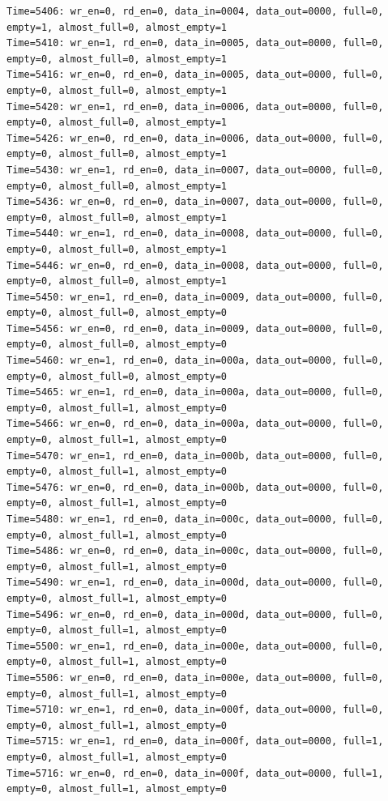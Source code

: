 \documentclass[UTF8]{ctexart}
\begin{document}
\begin{lstlisting}[frame=shadowbox]
Time=5406: wr_en=0, rd_en=0, data_in=0004, data_out=0000, full=0, empty=1, almost_full=0, almost_empty=1
Time=5410: wr_en=1, rd_en=0, data_in=0005, data_out=0000, full=0, empty=0, almost_full=0, almost_empty=1
Time=5416: wr_en=0, rd_en=0, data_in=0005, data_out=0000, full=0, empty=0, almost_full=0, almost_empty=1
Time=5420: wr_en=1, rd_en=0, data_in=0006, data_out=0000, full=0, empty=0, almost_full=0, almost_empty=1
Time=5426: wr_en=0, rd_en=0, data_in=0006, data_out=0000, full=0, empty=0, almost_full=0, almost_empty=1
Time=5430: wr_en=1, rd_en=0, data_in=0007, data_out=0000, full=0, empty=0, almost_full=0, almost_empty=1
Time=5436: wr_en=0, rd_en=0, data_in=0007, data_out=0000, full=0, empty=0, almost_full=0, almost_empty=1
Time=5440: wr_en=1, rd_en=0, data_in=0008, data_out=0000, full=0, empty=0, almost_full=0, almost_empty=1
Time=5446: wr_en=0, rd_en=0, data_in=0008, data_out=0000, full=0, empty=0, almost_full=0, almost_empty=1
Time=5450: wr_en=1, rd_en=0, data_in=0009, data_out=0000, full=0, empty=0, almost_full=0, almost_empty=0
Time=5456: wr_en=0, rd_en=0, data_in=0009, data_out=0000, full=0, empty=0, almost_full=0, almost_empty=0
Time=5460: wr_en=1, rd_en=0, data_in=000a, data_out=0000, full=0, empty=0, almost_full=0, almost_empty=0
Time=5465: wr_en=1, rd_en=0, data_in=000a, data_out=0000, full=0, empty=0, almost_full=1, almost_empty=0
Time=5466: wr_en=0, rd_en=0, data_in=000a, data_out=0000, full=0, empty=0, almost_full=1, almost_empty=0
Time=5470: wr_en=1, rd_en=0, data_in=000b, data_out=0000, full=0, empty=0, almost_full=1, almost_empty=0
Time=5476: wr_en=0, rd_en=0, data_in=000b, data_out=0000, full=0, empty=0, almost_full=1, almost_empty=0
Time=5480: wr_en=1, rd_en=0, data_in=000c, data_out=0000, full=0, empty=0, almost_full=1, almost_empty=0
Time=5486: wr_en=0, rd_en=0, data_in=000c, data_out=0000, full=0, empty=0, almost_full=1, almost_empty=0
Time=5490: wr_en=1, rd_en=0, data_in=000d, data_out=0000, full=0, empty=0, almost_full=1, almost_empty=0
Time=5496: wr_en=0, rd_en=0, data_in=000d, data_out=0000, full=0, empty=0, almost_full=1, almost_empty=0
Time=5500: wr_en=1, rd_en=0, data_in=000e, data_out=0000, full=0, empty=0, almost_full=1, almost_empty=0
Time=5506: wr_en=0, rd_en=0, data_in=000e, data_out=0000, full=0, empty=0, almost_full=1, almost_empty=0
Time=5710: wr_en=1, rd_en=0, data_in=000f, data_out=0000, full=0, empty=0, almost_full=1, almost_empty=0
Time=5715: wr_en=1, rd_en=0, data_in=000f, data_out=0000, full=1, empty=0, almost_full=1, almost_empty=0
Time=5716: wr_en=0, rd_en=0, data_in=000f, data_out=0000, full=1, empty=0, almost_full=1, almost_empty=0

\end{lstlisting}
\end{document}
